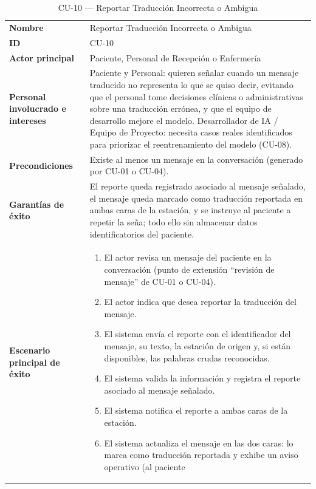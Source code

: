 \begin{longtable}{@{}>{\raggedright\arraybackslash}p{4.1cm} >{\raggedright\arraybackslash}p{\dimexpr\textwidth-4.1cm-2\tabcolsep\relax}@{}}
\caption{CU-10 --- Reportar Traducción Incorrecta o Ambigua}\\
\toprule
\textbf{Nombre} & Reportar Traducción Incorrecta o Ambigua \\
\textbf{ID} & CU-10 \\
\textbf{Actor principal} & Paciente, Personal de Recepción o Enfermería \\
\textbf{Personal involucrado e intereses} &
Paciente y Personal: quieren señalar cuando un mensaje traducido no
representa lo que se quiso decir, evitando que el personal tome decisiones
clínicas o administrativas sobre una traducción errónea, y que el equipo
de desarrollo mejore el modelo. \newline
Desarrollador de IA / Equipo de Proyecto: necesita casos reales
identificados para priorizar el reentrenamiento del modelo (CU-08). \\
\textbf{Precondiciones} &
Existe al menos un mensaje en la conversación (generado por CU-01 o
CU-04). \\
\textbf{Garantías de éxito} &
El reporte queda registrado asociado al mensaje señalado, el mensaje queda
marcado como traducción reportada en ambas caras de la estación, y se
instruye al paciente a repetir la seña; todo ello sin almacenar datos
identificatorios del paciente. \\
\textbf{Escenario principal de éxito} &
\begin{enumerate}[leftmargin=*, itemsep=2pt]
    \item El actor revisa un mensaje del paciente en la conversación
    (punto de extensión ``revisión de mensaje'' de CU-01 o CU-04).
    \item El actor indica que desea reportar la traducción del mensaje.
    \item El sistema envía el reporte con el identificador del mensaje, su
    texto, la estación de origen y, si están disponibles, las palabras
    crudas reconocidas.
    \item El sistema valida la información y registra el reporte asociado
    al mensaje señalado.
    \item El sistema notifica el reporte a ambas caras de la estación.
    \item El sistema actualiza el mensaje en las dos caras: lo marca como
    traducción reportada y exhibe un aviso operativo (al paciente

\end{enumerate}
\end{longtable}
